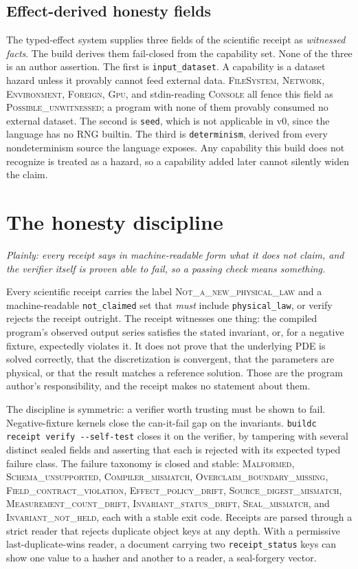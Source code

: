 \documentclass[11pt]{article}
\begin{document}
\subsection{Effect-derived honesty fields}

The typed-effect system supplies three fields of the scientific receipt as \emph{witnessed facts}. The build derives them fail-closed from the capability set. None of the three is an author assertion. The first is \texttt{input\_dataset}. A capability is a dataset hazard unless it provably cannot feed external data. \textsc{FileSystem}, \textsc{Network}, \textsc{Environment}, \textsc{Foreign}, \textsc{Gpu}, and stdin-reading \textsc{Console} all fence this field as \textsc{Possible\_unwitnessed}; a program with none of them provably consumed no external dataset. The second is \texttt{seed}, which is not applicable in v0, since the language has no RNG builtin. The third is \texttt{determinism}, derived from every nondeterminism source the language exposes. Any capability this build does not recognize is treated as a hazard, so a capability added later cannot silently widen the claim.

\section{The honesty discipline}
\label{sec:honesty}
\emph{Plainly: every receipt says in machine-readable form what it does not claim, and the verifier itself is proven able to fail, so a passing check means something.}

Every scientific receipt carries the label \textsc{Not\_a\_new\_physical\_law} and a machine-readable \texttt{not\_claimed} set that \emph{must} include \texttt{physical\_law}, or verify rejects the receipt outright. The receipt witnesses one thing: the compiled program's observed output series satisfies the stated invariant, or, for a negative fixture, expectedly violates it. It does not prove that the underlying PDE is solved correctly, that the discretization is convergent, that the parameters are physical, or that the result matches a reference solution. Those are the program author's responsibility, and the receipt makes no statement about them.

The discipline is symmetric: a verifier worth trusting must be shown to fail. Negative-fixture kernels close the can-it-fail gap on the invariants. \texttt{buildc receipt verify -{}-self-test} closes it on the verifier, by tampering with several distinct sealed fields and asserting that each is rejected with its expected typed failure class. The failure taxonomy is closed and stable: \textsc{Malformed}, \textsc{Schema\_unsupported}, \textsc{Compiler\_mismatch}, \textsc{Overclaim\_boundary\_missing}, \textsc{Field\_contract\_violation}, \textsc{Effect\_policy\_drift}, \textsc{Source\_digest\_mismatch}, \textsc{Measurement\_count\_drift}, \textsc{Invariant\_status\_drift}, \textsc{Seal\_mismatch}, and \textsc{Invariant\_not\_held}, each with a stable exit code. Receipts are parsed through a strict reader that rejects duplicate object keys at any depth. With a permissive last-duplicate-wins reader, a document carrying two \texttt{receipt\_status} keys can show one value to a hasher and another to a reader, a seal-forgery vector.
\end{document}
